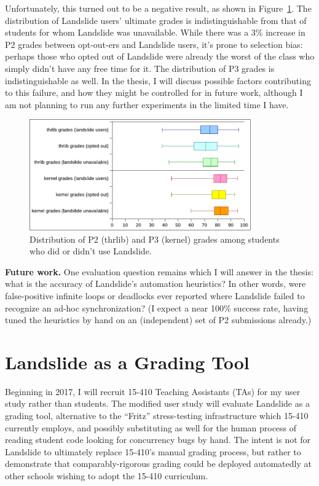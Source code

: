 Unfortunately, this turned out to be a negative result, as shown in Figure~\ref{fig:grade-distribution}.
The distribution of Landslide users' ultimate grades is indistinguishable from that of students for whom Landslide was unavailable.
While there was a 3\% increase in P2 grades between opt-out-ers and Landslide users, it's prone to selection bias:
perhaps those who opted out of Landslide were already the worst of the class who simply didn't have any free time for it.
The distribution of P3 grades is indistinguishable as well.
In the thesis, I will discuss possible factors contributing to this failure, and how they might be controlled for in future work,
although I am not planning to run any further experiments in the limited time I have.

\begin{figure}[h]
	\begin{center}
	\includegraphics[width=0.85\textwidth]{p2-p3-distribution.pdf}
	\end{center}
	\caption{Distribution of P2 (thrlib) and P3 (kernel) grades among students who did or didn't use Landslide.}
	\label{fig:grade-distribution}
\end{figure}


{\bf Future work.}
One evaluation question remains which I will answer in the thesis:
what is the accuracy of Landslide's automation heuristics?
In other words, were false-positive infinite loops or deadlocks ever reported
where Landslide failed to recognize an ad-hoc synchronization?
(I expect a near 100\% success rate,
having tuned the heuristics by hand on an (independent) set of P2 submissions already.)

\section{Landslide as a Grading Tool}
\label{sec:grading}

Beginning in 2017, I will recruit 15-410 Teaching Assistants (TAs) for my user study rather than students.
The modified user study will evaluate Landslide as a grading tool,
alternative to the ``Fritz'' stress-testing infrastructure which 15-410 currently employs,
and possibly substituting as well for the human process of reading student code looking for concurrency bugs by hand.
The intent is not for Landslide to ultimately replace 15-410's manual grading process,
but rather to demonstrate that comparably-rigorous grading could be deployed automatedly at other schools wishing to adopt the 15-410 curriculum.

